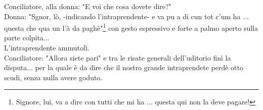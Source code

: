 Conciliatore, alla donna: "E voi che cosa dovete dire?"\\
Donna: "Sgnor, lò, -indicando l'intraprendente- e va pu a di cun tot c'um ha .\:.\:. questa che qua un l'à da paghè"\footnote{Signore, lui, va a dire con tutti che mi ha .\:.\:. questa qui non la deve pagare!} con gesto espressivo e forte a palmo aperto sulla parte colpita...\\
L'intraprendente ammutolì.\\
Conciliatore: "Allora siete pari" e tra le risate generali dell'uditorio finì la disputa... per la quale è da dire che il nostro grande intraprendete perdè otto scudi, senza nulla avere goduto. 



